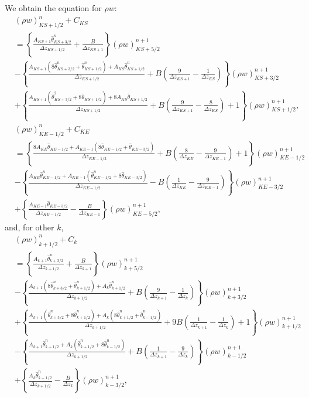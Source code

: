 We obtain the equation for $\rho w$:
\begin{align}
  & (\rho w)_{KS+1/2}^n + C_{KS} \nonumber \\
  &= \left\{\frac{A_{KS+1}\hat\theta_{KS+3/2}^n}{\Delta z_{KS+1/2}} + \frac{B}{\Delta z_{KS+1}}\right\} (\rho w)_{KS+5/2}^{n+1} \nonumber \\
  &- \left\{\frac{A_{KS+1}(8\hat\theta_{KS+3/2}^n+\hat\theta_{KS+1/2}^n)+A_{KS}\hat\theta_{KS+1/2}^n}{\Delta z_{KS+1/2}} + B\left(\frac{9}{\Delta z_{KS+1}}-\frac{1}{\Delta z_{KS}}\right)\right\} (\rho w)_{KS+3/2}^{n+1} \nonumber \\
  &+ \left\{\frac{A_{KS+1}(\hat\theta_{KS+3/2}^2+8\hat\theta_{KS+1/2}) + 8A_{KS}\hat\theta_{KS+1/2}}{\Delta z_{KS+1/2}} + B\left(\frac{9}{\Delta z_{KS+1}}-\frac{8}{\Delta z_{KS}}\right) + 1\right\} (\rho w)_{KS+1/2}^{n+1}, \\
  & (\rho w)_{KE-1/2}^n + C_{KE} \nonumber \\
  &= \left\{\frac{8A_{KE}\hat\theta_{KE-1/2} + A_{KE-1}(8\hat\theta_{KE-1/2}+\hat\theta_{KE-3/2})}{\Delta z_{KE-1/2}} + B\left(\frac{8}{\Delta z_{KE}}-\frac{9}{\Delta z_{KE-1}}\right) + 1\right\} (\rho w)_{KE-1/2}^{n+1} \nonumber \\
  &- \left\{\frac{A_{KE}\hat\theta_{KE-1/2}^n+A_{KE-1}(\hat\theta_{KE-1/2}^n+8\hat\theta_{KE-3/2})}{\Delta z_{KE-1/2}} - B\left(\frac{1}{\Delta z_{KE}}-\frac{9}{\Delta z_{KE-1}}\right)\right\} (\rho w)_{KE-3/2}^{n+1} \nonumber \\
  &+ \left\{\frac{A_{KE-1}\hat\theta_{KE-3/2}}{\Delta z_{KE-1/2}} - \frac{B}{\Delta z_{KE-1}}\right\} (\rho w)_{KE-5/2}^{n+1},
\end{align}
and, for other $k$,
\begin{align}
  & (\rho w)_{k+1/2}^n + C_k \\
  &= \left\{\frac{A_{k+1}\hat\theta_{k+3/2}^n}{\Delta z_{k+1/2}} + \frac{B}{\Delta z_{k+1}}\right\} (\rho w)_{k+5/2}^{n+1} \nonumber \\
  &- \left\{\frac{A_{k+1}(8\hat\theta_{k+3/2}^n+\hat\theta_{k+1/2}^n) + A_{k}\hat\theta_{k+1/2}^n}{\Delta z_{k+1/2}} + B\left(\frac{9}{\Delta z_{k+1}}-\frac{1}{\Delta z_k}\right)\right\} (\rho w)_{k+3/2}^{n+1} \nonumber \\
  &+ \left\{\frac{A_{k+1}(\hat\theta_{k+3/2}^n+8\hat\theta_{k+1/2}^n) + A_k(8\hat\theta_{k+1/2}^n+\hat\theta_{k-1/2}^n)}{\Delta z_{k+1/2}} + 9B\left(\frac{1}{\Delta z_{k+1}}-\frac{1}{\Delta z_k}\right) + 1\right\} (\rho w)_{k+1/2}^{n+1} \nonumber \\
  &- \left\{\frac{A_{k+1}\hat\theta_{k+1/2}^n + A_k(\hat\theta_{k+1/2}^n+8\hat\theta_{k-1/2}^n)}{\Delta z_{k+1/2}} + B\left(\frac{1}{\Delta z_{k+1}}-\frac{9}{\Delta z_k}\right)\right\} (\rho w)_{k-1/2}^{n+1} \nonumber \\
  &+ \left\{\frac{A_k\hat\theta_{k-1/2}^n}{\Delta z_{k+1/2}} - \frac{B}{\Delta z_k}\right\} (\rho w)_{k-3/2}^{n+1},
\end{align}
